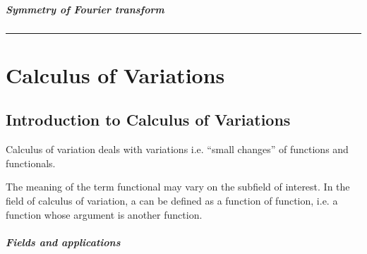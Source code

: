 \documentclass[letterpaper,10pt,english]{jupyterBook}
\begin{document}
\subsubsection{Symmetry of Fourier transform}
\label{\detokenize{ch/complex/fourier-transforms:symmetry-of-fourier-transform}}\label{\detokenize{ch/complex/fourier-transforms:complex-fourier-useful-properties-symmetry}}

\bigskip\hrule\bigskip


\sphinxstepscope


\part{Calculus of Variations}

\sphinxstepscope


\chapter{Introduction to Calculus of Variations}
\label{\detokenize{ch/calculus-variations/intro:introduction-to-calculus-of-variations}}\label{\detokenize{ch/calculus-variations/intro:calculus-variations-intro}}\label{\detokenize{ch/calculus-variations/intro::doc}}
\sphinxAtStartPar
Calculus of variation deals with variations \sphinxhyphen{} i.e. “small changes” \sphinxhyphen{} of functions and functionals.

\sphinxAtStartPar
The meaning of the term functional may vary on the subfield of interest. In the field of calculus of variation, a  can be defined as a function of function, i.e. a function whose argument is another function.
\subsubsection*{Fields and applications}
\end{document}
